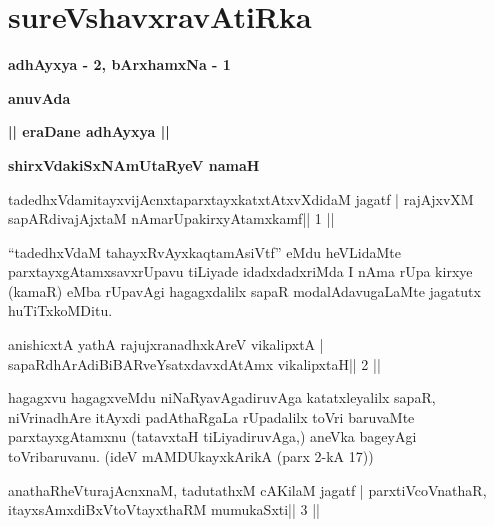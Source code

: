 \chapter{sureVshavxravAtiRka}

\begin{center}
{\Large\textbf{adhAyxya - 2, bArxhamxNa - 1}}
\medskip

{\large\textbf{anuvAda}}
\medskip

{\large\textbf{|| eraDane adhAyxya ||}}
\medskip

\centerline{\bf shirxVdakiSxNAmUtaRyeV namaH}
\end{center}


\begin{shl}
tadedhxVdamitayxvijAcnxtaparxtayxkatxtAtxvXdidaM jagatf |
rajAjxvXM sapARdivajAjxtaM nAmarUpakirxyAtamxkamf\hfill || 1 ||
\end{shl}

\begin{artha}
``tadedhxVdaM tahayxRvAyxkaqtamAsiVtf'' eMdu heVLidaMte parxtayxgAtamxsavxrUpavu tiLiyade idadxdadxriMda I nAma rUpa kirxye (kamaR) eMba rUpavAgi hagagxdalilx sapaR modalAdavugaLaMte jagatutx huTiTxkoMDitu.
\end{artha} 
 

\begin{shl}
anishicxtA yathA rajujxranadhxkAreV vikalipxtA |
sapaRdhArAdiBiBARveYsatxdavxdAtAmx vikalipxtaH\hfill || 2 ||
\end{shl}

\begin{artha}
hagagxvu hagagxveMdu niNaRyavAgadiruvAga katatxleyalilx sapaR, 
niVrinadhAre itAyxdi padAthaRgaLa rUpadalilx toVri baruvaMte 
parxtayxgAtamxnu (tatavxtaH tiLiyadiruvAga,) aneVka bageyAgi 
toVribaruvanu. (ideV mAMDUkayxkArikA (parx 2-kA 17)) 
\end{artha}


\begin{shl}
anathaRheVturajAcnxnaM, tadutathxM cAKilaM jagatf |
parxtiVcoV\s nathaR, itayxsAmxdiBxVtoV\s tayxthaRM mumukaSxti\hfill || 3 ||
\end{shl}

